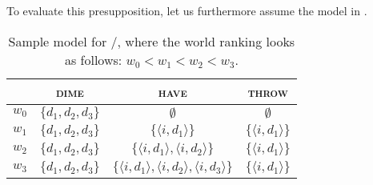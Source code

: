 \xe
To evaluate this presupposition, let us furthermore assume the model in .
\begin{table}[!htb]
\caption{Sample model for /, where the world ranking looks as follows: $w_0<w_1<w_2<w_3$.}
    \begin{tabular}{lccc}\toprule
            & {\scshape dime} & {\scshape have} & {\scshape throw}\\\midrule
            $w_0$ & $\{d_1,d_2,d_3\}$ & $\emptyset$ & $\emptyset$\\
            $w_1$ & $\{d_1,d_2,d_3\}$ & $\{\langle i,d_1\rangle\}$ & $\{\langle i,d_1\rangle\}$\\
            $w_2$ & $\{d_1,d_2,d_3\}$ & $\{\langle i,d_1\rangle,\langle i,d_2\rangle\}$ & $\{\langle i,d_1\rangle\}$\\
            $w_3$ & $\{d_1,d_2,d_3\}$ & $\{\langle i,d_1\rangle,\langle i,d_2\rangle,\langle i,d_3\rangle\}$ & $\{\langle i,d_1\rangle\}$\\
          \bottomrule
    \end{tabular}
\end{table}

